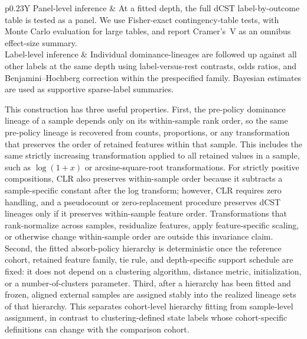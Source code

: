 \documentclass[11pt]{article}
\newcounter{algorithm}
\begin{document}
\begin{table}[H]
\begin{tabularx}{\linewidth}{p{0.23\linewidth}Y}
Panel-level inference & At a fitted depth, the full dCST label-by-outcome table is tested as a panel. We use Fisher-exact contingency-table tests, with Monte Carlo evaluation for large tables, and report Cramer's~V as an omnibus effect-size summary. \\
Label-level inference & Individual dominance-lineages are followed up against all other labels at the same depth using label-versus-rest contrasts, odds ratios, and Benjamini--Hochberg correction within the prespecified family. Bayesian estimates are used as supportive sparse-label summaries. \\
\bottomrule
\end{tabularx}
\caption{Operational dCST construction and inference workflow, summarizing
the formal definition above and the inferential roles used in the main
analyses. Figure~\ref{fig:dcst-concept} gives the intuition;
Algorithm~\ref{alg:dcst-fit-transfer} gives the fitting procedure.}
\label{tab:dcst-workflow}
\end{table}

This construction has three useful properties. First, the pre-policy dominance
lineage of a sample depends only on its within-sample rank order, so the same
pre-policy lineage is recovered from counts, proportions, or any transformation
that preserves the order of retained features within that sample. This includes
the same strictly increasing transformation applied to all retained values in a
sample, such as \(\log(1+x)\) or
arcsine-square-root transformations. For strictly positive compositions, CLR
also preserves within-sample order because it subtracts a sample-specific
constant after the log transform; however, CLR requires zero handling, and a
pseudocount or zero-replacement procedure preserves dCST lineages only if it
preserves within-sample feature order. Transformations that rank-normalize
across samples, residualize features, apply feature-specific scaling, or
otherwise change within-sample order are outside this invariance claim. Second,
the fitted absorb-policy hierarchy is deterministic once the reference cohort,
retained feature family, tie rule, and depth-specific support schedule are
fixed: it does not depend on a clustering algorithm, distance metric,
initialization, or a number-of-clusters parameter. Third, after a hierarchy has
been fitted and frozen, aligned external samples are assigned stably into the
realized lineage sets of that hierarchy. This separates cohort-level hierarchy
fitting from sample-level assignment, in contrast to clustering-defined state
labels whose cohort-specific definitions can change with the comparison cohort.
\end{document}
